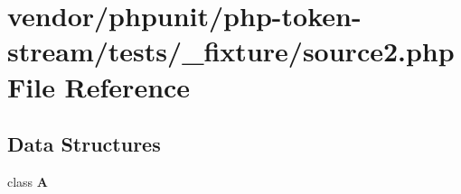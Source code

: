 \section{vendor/phpunit/php-\/token-\/stream/tests/\+\_\+fixture/source2.php File Reference}
\label{source2_8php}
\subsection*{Data Structures}
\begin{DoxyCompactItemize}
\item 
class {\bf A}
\end{DoxyCompactItemize}

